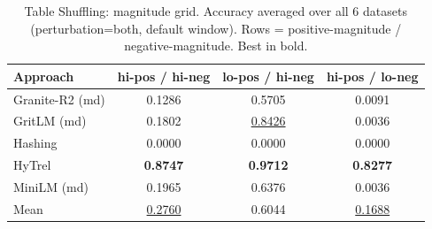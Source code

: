 \begin{table}[t]
\centering
\begin{tabular*}{\textwidth}{lccc}
\hline
Approach & hi-pos / hi-neg & lo-pos / hi-neg & hi-pos / lo-neg \\
\hline
Granite-R2 (md) & 0.1286 & 0.5705 & 0.0091 \\
GritLM (md) & 0.1802 & \underline{0.8426} & 0.0036 \\
Hashing & 0.0000 & 0.0000 & 0.0000 \\
HyTrel & \textbf{0.8747} & \textbf{0.9712} & \textbf{0.8277} \\
MiniLM (md) & 0.1965 & 0.6376 & 0.0036 \\
Mean & \underline{0.2760} & 0.6044 & \underline{0.1688} \\
\hline
\end{tabular*}
\caption{Table Shuffling: magnitude grid. Accuracy averaged over all 6 datasets (perturbation=both, default window). Rows = positive-magnitude / negative-magnitude. Best in bold.}
\label{tab:shuffling_magnitude}
\end{table}
